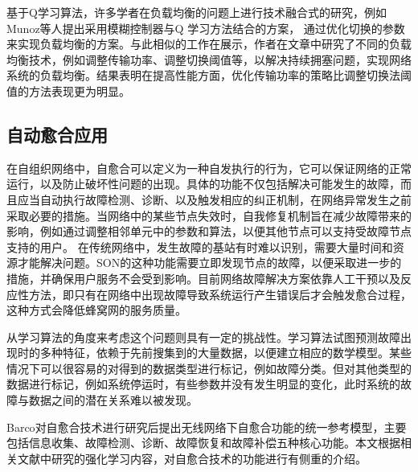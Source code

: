 ﻿\documentclass[11pt,draftclsnofoot,onecolumn,journal,letterpaper]{IEEEtran}
\begin{document}
基于Q学习算法，许多学者在负载均衡的问题上进行技术融合式的研究，例如Munoz等人\cite{Munoz2011}提出采用模糊控制器与Q 学习方法结合的方案， 通过优化切换的参数来实现负载均衡的方案。与此相似的工作在\cite{Munoz2013}展示，作者在文章中研究了不同的负载均衡技术，例如调整传输功率、调整切换阈值等，以解决持续拥塞问题，实现网络系统的负载均衡。结果表明在提高性能方面，优化传输功率的策略比调整切换法阈值的方法表现更为明显。





%
%


\subsection{自动愈合应用}

在自组织网络中，自愈合可以定义为一种自发执行的行为，它可以保证网络的正常运行，以及防止破坏性问题的出现。具体的功能不仅包括解决可能发生的故障，而且应当自动执行故障检测、诊断、以及触发相应的纠正机制，在网络异常发生之前采取必要的措施。当网络中的某些节点失效时，自我修复机制旨在减少故障带来的影响，例如通过调整相邻单元中的参数和算法，以便其他节点可以支持受故障节点支持的用户。 在传统网络中，发生故障的基站有时难以识别，需要大量时间和资源才能解决问题。SON的这种功能需要立即发现节点的故障，以便采取进一步的措施，并确保用户服务不会受到影响。目前网络故障解决方案依靠人工干预以及反应性方法，即只有在网络中出现故障导致系统运行产生错误后才会触发愈合过程，这种方式会降低蜂窝网的服务质量。

从学习算法的角度来考虑这个问题则具有一定的挑战性。学习算法试图预测故障出现时的多种特征，依赖于先前搜集到的大量数据，以便建立相应的数学模型。某些情况下可以很容易的对得到的数据类型进行标记，例如故障分类。但对其他类型的数据进行标记，例如系统停运时，有些参数并没有发生明显的变化，此时系统的故障与数据之间的潜在关系难以被发现。

Barco\cite{Barco2012}对自愈合技术进行研究后提出无线网络下自愈合功能的统一参考模型，主要包括信息收集、故障检测、诊断、故障恢复和故障补偿五种核心功能。本文根据相关文献中研究的强化学习内容，对自愈合技术的功能进行有侧重的介绍。
\end{document}
